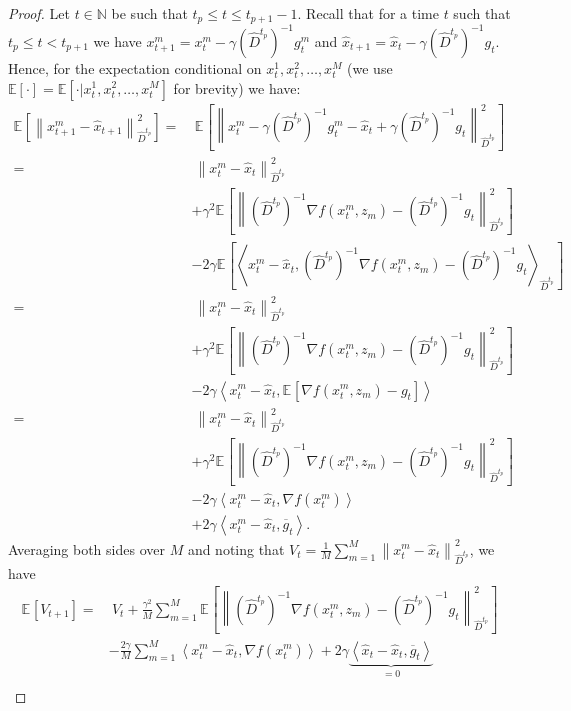 \documentclass[sn-mathphys,Numbered]{sn-jnl}%
\newcommand*{\E}{{\mathbb E}}
\renewcommand{\|}{\parallel}
\newcommand\ec[2][]{\ensuremath{\mathbb{E}_{#1} \left[#2\right]}}
\newcommand\ecn[3][]{\ec[#1]{\norm{#2}^2_{#3}}}
\newcommand\ev[1]{\left \langle #1 \right \rangle}
\newcommand{\N}{\mathbb{N}}
\newcommand{\norm}[1]{\left\lVert#1\right\rVert}
\newcommand{\sqn}[1]{{\left\lVert#1\right\rVert}^2}
\renewcommand {\*} {\ast}
\begin{document}
\begin{proof}
     Let $t \in \N$ be such that $t_p \leq t \leq t_{p+1} - 1$. Recall that for a time $t$ such that $t_p \leq t < t_{p+1}$ we have $x_{t+1}^m = x_t^m - \gamma (\hat{D}^{t_p})^{-1}g_{t}^m$ and $\hat{x}_{t+1} = \hat{x}_t - \gamma (\hat{D}^{t_p})^{-1}g_t$. Hence, for the expectation conditional on $x_t^1, x_t^2, \ldots, x_t^M$ (we use $\E \left[\cdot \right] = \E \left[\cdot| x_t^1, x_t^2, \ldots, x_t^M\right]$ for brevity) we have:
     \begin{align*}
         \ecn{x_{t+1}^m - \hat{x}_{t+1}}{\hat{D}^{t_p}} =&\ \ecn{x_t^m - \gamma (\hat{D}^{t_p})^{-1}g_{t}^m - \hat{x}_t + \gamma (\hat{D}^{t_p})^{-1}g_t}{\hat{D}^{t_p}}
         \\ =&\ \sqn{x_t^m - \hat{x}_t}_{\hat{D}^{t_p}} \\
         &+ \gamma^2 \ecn{(\hat{D}^{t_p})^{-1}\nabla f(x_t^m, z_m) - (\hat{D}^{t_p})^{-1}g_t}{\hat{D}^{t_p}} \\&- 2 \gamma \ec{\ev{x_t^m - \hat{x}_t, (\hat{D}^{t_p})^{-1}\nabla f(x_t^m, z_m) - (\hat{D}^{t_p})^{-1}g_t}_{\hat{D}^{t_p}}} \\
         =&\ \sqn{x_t^m - \hat{x}_t}_{\hat{D}^{t_p}} \\
         &+ \gamma^2 \ecn{(\hat{D}^{t_p})^{-1}\nabla f(x_t^m, z_m) - (\hat{D}^{t_p})^{-1}g_t}{\hat{D}^{t_p}} \\&- 2 \gamma \ev{x_t^m - \hat{x}_t, \ec{\nabla f(x_t^m, z_m) - g_t}} \\
         =&\ \sqn{x_t^m - \hat{x}_t}_{\hat{D}^{t_p}} \\ &+ \gamma^2 \ecn{(\hat{D}^{t_p})^{-1}\nabla f(x_t^m, z_m) - (\hat{D}^{t_p})^{-1}g_t}{\hat{D}^{t_p}}  \\ &- 2 \gamma \ev{x_t^m - \hat{x}_t, \nabla f(x_{t}^m)} \\
         &+ 2 \gamma \ev{x_t^m - \hat{x}_t, \overline{g}_t}.
     \end{align*}
     Averaging both sides over $M$ and noting that $V_t = \frac{1}{M} \sum\limits_{m=1}^M \sqn{x_{t}^m - \hat{x}_t}_{\hat{D}^{t_p}}$, we have
     \begin{align}
         \ec{V_{t+1}} =&\ V_t + \frac{\gamma^2}{M} \sum\limits_{m=1}^M \ecn{(\hat{D}^{t_p})^{-1}\nabla f(x_t^m, z_m) - (\hat{D}^{t_p})^{-1}g_t}{\hat{D}^{t_p}} \nonumber \\ &- \frac{2 \gamma}{M} \sum\limits_{m=1}^M \ev{x_t^m - \hat{x}_t, \nabla f(x_t^m)} + 2 \gamma \underbrace{\ev{ \hat{x}_t - \hat{x}_t, \overline{g}_t}}_{=0} \nonumber \\

\end{align}
\end{proof}
\end{document}
